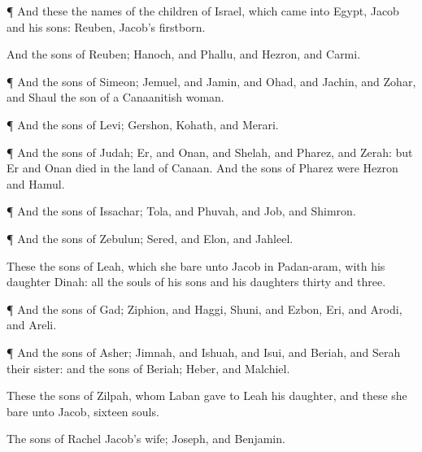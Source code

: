 {\par }{\PP {}¶ And these
{} the
names of the
children of
Israel, which
came into
Egypt,
Jacob and his
sons:
Reuben,
Jacob’s
firstborn.

And the
sons of
Reuben;
Hanoch, and
Phallu, and
Hezron, and
Carmi.


\par }{\PP {}¶ And the
sons of
Simeon;
Jemuel, and
Jamin, and
Ohad, and
Jachin, and
Zohar, and
Shaul the
son of a
Canaanitish woman.


\par }{\PP {}¶ And the
sons of
Levi;
Gershon,
Kohath, and
Merari.


\par }{\PP {}¶ And the
sons of
Judah;
Er, and
Onan, and
Shelah, and
Pharez, and
Zerah: but
Er and
Onan
died in the
land of
Canaan. And the
sons of
Pharez were
Hezron and
Hamul.


\par }{\PP {}¶ And the
sons of
Issachar;
Tola, and
Phuvah, and
Job, and
Shimron.


\par }{\PP {}¶ And the
sons of
Zebulun;
Sered, and
Elon, and
Jahleel.

These
{} the
sons of
Leah, which she
bare unto
Jacob in
Padan-aram, with his
daughter
Dinah: all the
souls of his
sons and his
daughters
{}
thirty and
three.


\par }{\PP {}¶ And the
sons of
Gad;
Ziphion, and
Haggi,
Shuni, and
Ezbon,
Eri, and
Arodi, and
Areli.


\par }{\PP {}¶ And the
sons of
Asher;
Jimnah, and
Ishuah, and
Isui, and
Beriah, and
Serah their
sister: and the
sons of
Beriah;
Heber, and
Malchiel.

These
{} the
sons of
Zilpah, whom
Laban
gave to
Leah his
daughter, and these she
bare unto
Jacob,
{}
sixteen
souls.

The
sons of
Rachel
Jacob’s
wife;
Joseph, and
Benjamin.


}
